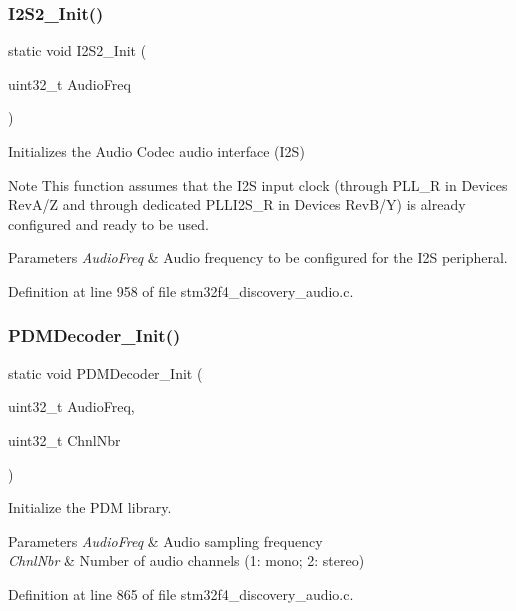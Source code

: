 \subsubsection{\texorpdfstring{I2\+S2\+\_\+\+Init()}{I2S2\_Init()}}
{\footnotesize\ttfamily static void I2\+S2\+\_\+\+Init (\begin{DoxyParamCaption}\item[{uint32\+\_\+t}]{Audio\+Freq }\end{DoxyParamCaption})\hspace{0.3cm}{\ttfamily [static]}}



Initializes the Audio Codec audio interface (I2S) 

\begin{DoxyNote}{Note}
This function assumes that the I2S input clock (through P\+L\+L\+\_\+R in Devices Rev\+A/Z and through dedicated P\+L\+L\+I2\+S\+\_\+R in Devices Rev\+B/Y) is already configured and ready to be used. ~\newline

\end{DoxyNote}

\begin{DoxyParams}{Parameters}
{\em Audio\+Freq} & Audio frequency to be configured for the I2S peripheral. \\
\hline
\end{DoxyParams}


Definition at line 958 of file stm32f4\+\_\+discovery\+\_\+audio.\+c.

\mbox{\label{group___s_t_m32_f4___d_i_s_c_o_v_e_r_y___a_u_d_i_o___i_n___private___functions_ga4e91ea9d0157bbdd6251f3361ee062bb}} 
\subsubsection{\texorpdfstring{P\+D\+M\+Decoder\+\_\+\+Init()}{PDMDecoder\_Init()}}
{\footnotesize\ttfamily static void P\+D\+M\+Decoder\+\_\+\+Init (\begin{DoxyParamCaption}\item[{uint32\+\_\+t}]{Audio\+Freq,  }\item[{uint32\+\_\+t}]{Chnl\+Nbr }\end{DoxyParamCaption})\hspace{0.3cm}{\ttfamily [static]}}



Initialize the P\+DM library. 


\begin{DoxyParams}{Parameters}
{\em Audio\+Freq} & Audio sampling frequency \\
\hline
{\em Chnl\+Nbr} & Number of audio channels (1\+: mono; 2\+: stereo) \\
\hline
\end{DoxyParams}


Definition at line 865 of file stm32f4\+\_\+discovery\+\_\+audio.\+c.

